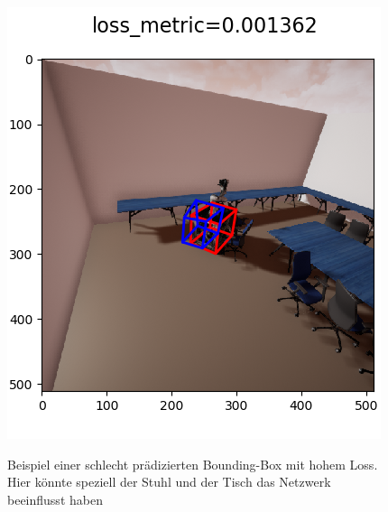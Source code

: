 \begin{figure}[!htb]
\begin{minipage}[b]{.5\linewidth}
      \includegraphics[width=\linewidth]{bbs/schlecht.png}
      \label{vdiffX_unsymm} 
      \caption{Beispiel einer schlecht prädizierten Bounding-Box mit hohem Loss. Hier könnte speziell der Stuhl und der Tisch das Netzwerk beeinflusst haben}
   \end{minipage}
\end{figure}
\newpage